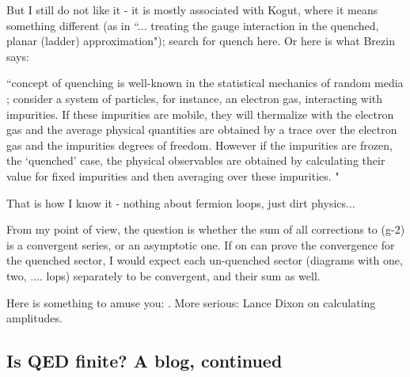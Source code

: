 \begin{description}
But I still do not like it - it is mostly associated with Kogut, where it
means something different (as in ``... treating the gauge interaction in
the quenched, planar (ladder) approximation"); search for quench
 {here}. Or
here is what Brezin says:

``concept of quenching is well-known in the statistical mechanics of
random media ; consider a system of particles, for instance, an electron
gas, interacting with impurities. If these impurities are mobile, they
will thermalize with the electron gas and the average physical quantities
are obtained by a trace over the electron gas and the impurities degrees
of freedom. However if the impurities are frozen, the `quenched' case,
the physical observables are obtained by calculating their value for
fixed impurities and then averaging over these
impurities. "

That is how I know it - nothing about fermion loops, just dirt physics...

From my point of view, the question is whether the sum of all
corrections to (g-2) is a convergent series, or an asymptotic one.
If on can prove the convergence for the quenched sector, I would
expect each un-quenched sector (diagrams with one, two, .... lops)
separately to be convergent, and their sum as well.

Here is something to amuse you:
.
More serious: Lance Dixon
{on calculating amplitudes}.

\end{description}

\subsection{Is QED finite? A blog, continued}
\label{sect:finiteBlog}


